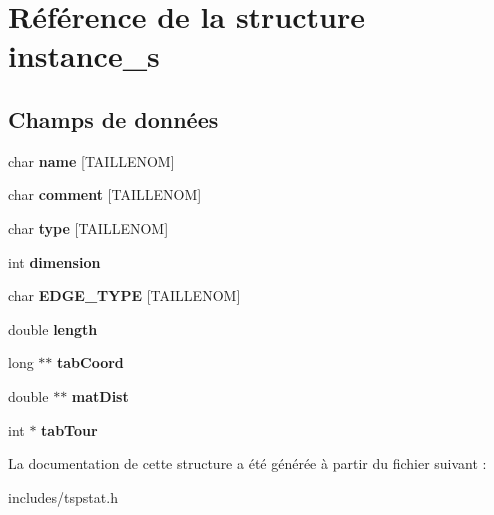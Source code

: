 \hypertarget{structinstance__s}{}\section{Référence de la structure instance\+\_\+s}
\label{structinstance__s}
\subsection*{Champs de données}
\begin{DoxyCompactItemize}
\item 
\mbox{\label{structinstance__s_a565608b0bf4d8a4efe7dd6ba865a2844}} 
char {\bfseries name} \mbox{[}T\+A\+I\+L\+L\+E\+N\+OM\mbox{]}
\item 
\mbox{\label{structinstance__s_a540ec6211d99e222a3ce0fac319cfa71}} 
char {\bfseries comment} \mbox{[}T\+A\+I\+L\+L\+E\+N\+OM\mbox{]}
\item 
\mbox{\label{structinstance__s_a4a6dadd1e948103a3c5186a584d16331}} 
char {\bfseries type} \mbox{[}T\+A\+I\+L\+L\+E\+N\+OM\mbox{]}
\item 
\mbox{\label{structinstance__s_a28711b0862ace836adb63c8a1830e1f8}} 
int {\bfseries dimension}
\item 
\mbox{\label{structinstance__s_a517ec13ff6b5c9bfba128dbe94787d8f}} 
char {\bfseries E\+D\+G\+E\+\_\+\+T\+Y\+PE} \mbox{[}T\+A\+I\+L\+L\+E\+N\+OM\mbox{]}
\item 
\mbox{\label{structinstance__s_a45dbdbfcdcbf773d2cb14f5d880623ff}} 
double {\bfseries length}
\item 
\mbox{\label{structinstance__s_a5f7ed9ce23dce25f0c513565f93b08f9}} 
long $\ast$$\ast$ {\bfseries tab\+Coord}
\item 
\mbox{\label{structinstance__s_a38f0946439fb1f1149ececdca0055e0d}} 
double $\ast$$\ast$ {\bfseries mat\+Dist}
\item 
\mbox{\label{structinstance__s_a4c6450701def0f8ddd62426d523a2731}} 
int $\ast$ {\bfseries tab\+Tour}
\end{DoxyCompactItemize}


La documentation de cette structure a été générée à partir du fichier suivant \+:\begin{DoxyCompactItemize}
\item 
includes/tspstat.\+h\end{DoxyCompactItemize}
